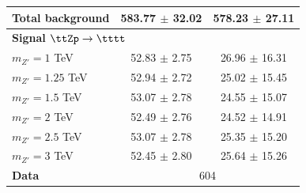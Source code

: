 \documentclass[../thesis.tex]{subfiles}
\begin{document}
\begin{table}[!htb]
{\begin{tabular}{lcc}
      \midrule
      Total background		 	& 583.77 $\pm$ 32.02	& 578.23 $\pm$ 27.11 \\
      \midrule
      \multicolumn{3}{l}{\textbf{Signal $\ttZp \rightarrow \tttt$}} 	\\	
      $m_{Z'}=1$ TeV 			& 52.83 $\pm$ 2.75		& 26.96 $\pm$ 16.31 \\
      $m_{Z'}=1.25$ TeV 		& 52.94 $\pm$ 2.72		& 25.02 $\pm$ 15.45 \\
      $m_{Z'}=1.5$ TeV 			& 53.07 $\pm$ 2.78		& 24.55 $\pm$ 15.07 \\
      $m_{Z'}=2$ TeV 			& 52.49 $\pm$ 2.76		& 24.52 $\pm$ 14.91 \\
      $m_{Z'}=2.5$ TeV 			& 53.07 $\pm$ 2.78		& 25.35 $\pm$ 15.20 \\
      $m_{Z'}=3$ TeV 			& 52.45 $\pm$ 2.80		& 25.64 $\pm$ 15.26 \\
      \midrule
      \textbf{Data}				& \multicolumn{2}{c}{604} 		\\
      \midrule\bottomrule
    \end{tabular}
}
\end{table}
\end{document}
